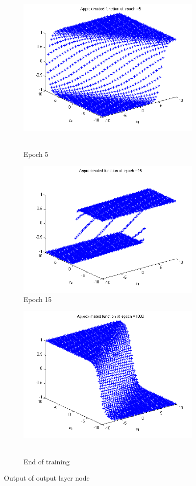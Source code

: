 \documentclass{article}
\begin{document}
\begin{figure}
  \begin{subfigure}{.5\textwidth}
  \centering
  \includegraphics[width=.8\linewidth]{Regression/bivariate/hidden_1layer_5.png}\
  \caption{Epoch 5}
\end{subfigure}%
\begin{subfigure}{.5\textwidth}
  \centering
  \includegraphics[width=.8\linewidth]{Regression/bivariate/hidden_1layer_15.png}
   \caption{Epoch 15}
  \end{subfigure}
  
  \begin{subfigure}{.5\textwidth}
  \centering
  \includegraphics[width=.8\linewidth]{Regression/bivariate/hidden_1layer_1000.png}\
  \caption{End of training}
\end{subfigure}%
  
\caption{Output of output layer node}
\end{figure}
\end{document}
